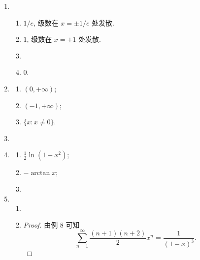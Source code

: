 % 
\begin{enumerate}
    \item %
        \begin{enumerate}[(1)]
            \item %
                $1/e$, 级数在 $x = \pm1/e$ 处发散.
            \item %
                $1$, 级数在 $x = \pm1$ 处发散.
            \item %
            \item %
                $0$.
        \end{enumerate}
    \item %
        \begin{multicols}{3}
            \begin{enumerate}[(1)]
                \item %
                    $(0, +\infty)$;
                \item %
                    $(-1, +\infty)$;
                \item %
                    $\{x: x \not=0\}$.
            \end{enumerate}
        \end{multicols}
    \item %
    \item %
        \begin{multicols}{3}
            \begin{enumerate}[(1)]
                \item %
                    $\frac{1}{2}\ln(1-x^2)$;
                \item %
                    $-\arctan{x}$;
                \item %
            \end{enumerate}
        \end{multicols}
    \item %
        \begin{enumerate}[(1)]
            \item %
            \item %
                \begin{proof}
                    由例 8 可知
                    \[
                        \sum_{n=1}^\infty\frac{(n+1)(n+2)}{2}x^n = \frac{1}{(1-x)^3}.    
\]
\end{proof}
\end{enumerate}
\end{enumerate}
